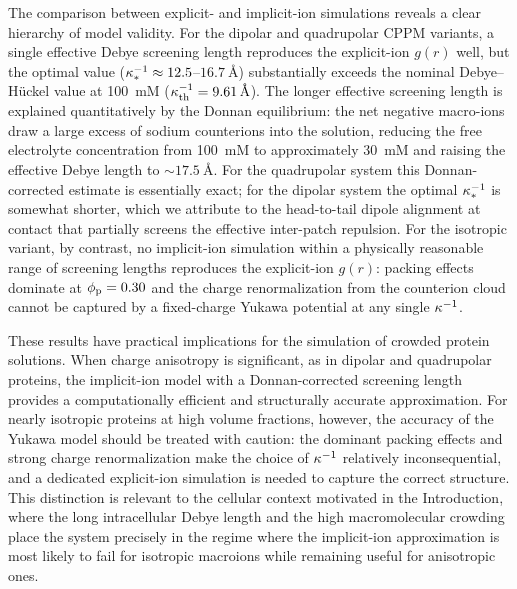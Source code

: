 \documentclass{article}
\begin{document}
The comparison between explicit- and implicit-ion simulations reveals a clear hierarchy of model validity.
For the dipolar and quadrupolar CPPM variants, a single effective Debye screening length reproduces the explicit-ion $g(r)$ well, but the optimal value ($\kappa^{-1}_* \approx 12.5$--$\qty{16.7}{\angstrom}$) substantially exceeds the nominal Debye--Hückel value at \qty{100}{mM} ($\kappa^{-1}_\mathrm{th} = \qty{9.61}{\angstrom}$).
The longer effective screening length is explained quantitatively by the Donnan equilibrium: the net negative macro-ions draw a large excess of sodium counterions into the solution, reducing the free electrolyte concentration from \qty{100}{mM} to approximately \qty{30}{mM} and raising the effective Debye length to $\sim\!\qty{17.5}{\angstrom}$.
For the quadrupolar system this Donnan-corrected estimate is essentially exact; for the dipolar system the optimal $\kappa^{-1}_*$ is somewhat shorter, which we attribute to the head-to-tail dipole alignment at contact that partially screens the effective inter-patch repulsion.
For the isotropic variant, by contrast, no implicit-ion simulation within a physically reasonable range of screening lengths reproduces the explicit-ion $g(r)$: packing effects dominate at $\phi_\mathrm{p} = 0.30$ and the charge renormalization from the counterion cloud cannot be captured by a fixed-charge Yukawa potential at any single $\kappa^{-1}$.

These results have practical implications for the simulation of crowded protein solutions.
When charge anisotropy is significant, as in dipolar and quadrupolar proteins, the implicit-ion model with a Donnan-corrected screening length provides a computationally efficient and structurally accurate approximation.
For nearly isotropic proteins at high volume fractions, however, the accuracy of the Yukawa model should be treated with caution: the dominant packing effects and strong charge renormalization make the choice of $\kappa^{-1}$ relatively inconsequential, and a dedicated explicit-ion simulation is needed to capture the correct structure.
This distinction is relevant to the cellular context motivated in the Introduction, where the long intracellular Debye length and the high macromolecular crowding place the system precisely in the regime where the implicit-ion approximation is most likely to fail for isotropic macroions while remaining useful for anisotropic ones.




\end{document}
